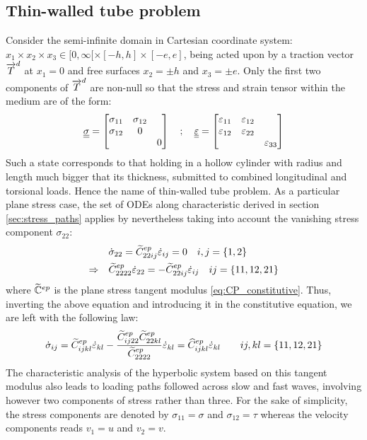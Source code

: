 \subsection{Thin-walled tube problem}
\label{sec:num_thin-walled}
Consider the semi-infinite domain in Cartesian coordinate system: $x_1 \times x_2 \times x_3 \in [0,\infty[ \times [-h,h] \times [-e,e]$, being acted upon by a traction vector ${\overrightarrow{T}}^d$ at $x_1=0 $ and free surfaces $x_2=\pm h$ and $x_3=\pm e$.
Only the first two components of ${\overrightarrow{T}}^d$ are non-null so that the stress and strain tensor within the medium are of the form:
\begin{equation}
  {\underline{\underline{\sigma}}} = \left[\begin{matrix}\sigma_{11} & \sigma_{12} & \\ \sigma_{12} & 0 & \\ & & 0\end{matrix}\right] \quad ;\quad{\underline{\underline{\varepsilon}}} = \left[\begin{matrix}\varepsilon_{11} & \varepsilon_{12} & \\ \varepsilon_{12} & \varepsilon_{22}& \\ & & \varepsilon_{33}\end{matrix}\right]
\end{equation}
Such a state corresponds to that holding in a hollow cylinder with radius and length much bigger that its thickness, submitted to combined longitudinal and torsional loads.
Hence the name of thin-walled tube problem. 
As a particular plane stress case, the set of ODEs along characteristic derived in section \ref{sec:stress_paths} applies by nevertheless taking into account the vanishing stress component $\sigma_{22}$:
\begin{align*}
  & \dot{\sigma}_{22}=\widetilde{C}^{ep}_{22ij} \dot{\varepsilon}_{ij} =0 \quad i,j=\{1,2\} \\
  \Rightarrow  \quad  &\widetilde{C}^{ep}_{2222} \dot{\varepsilon}_{22} = - \widetilde{C}^{ep}_{22ij}\dot{\varepsilon}_{ij} \quad ij=\{11,12,21\}
\end{align*}
where $\widetilde{\mathbb{C}}^{ep}$ is the plane stress tangent modulus \eqref{eq:CP_constitutive}.
Thus, inverting the above equation and introducing it in the constitutive equation, we are left with the following law:
\begin{equation}
  \label{eq:ch5_TW_tangent}
  \dot{\sigma}_{ij}=\widetilde{C}^{ep}_{ijkl} \dot{\varepsilon}_{kl} - \frac{\widetilde{C}^{ep}_{ij22}\widetilde{C}^{ep}_{22kl}}{\widetilde{C}^{ep}_{2222}}\dot{\varepsilon}_{kl}= \widehat{C}^{ep}_{ijkl} \dot{\varepsilon}_{kl}\qquad ij,kl=\{11,12,21\} 
\end{equation}
The characteristic analysis of the hyperbolic system based on this tangent modulus also leads to loading paths followed across slow and fast waves, involving however two components of stress rather than three. For the sake of simplicity, the stress components are denoted by $\sigma_{11}=\sigma$ and $\sigma_{12}=\tau$ whereas the velocity components reads $v_1=u$ and $v_2=v$.

